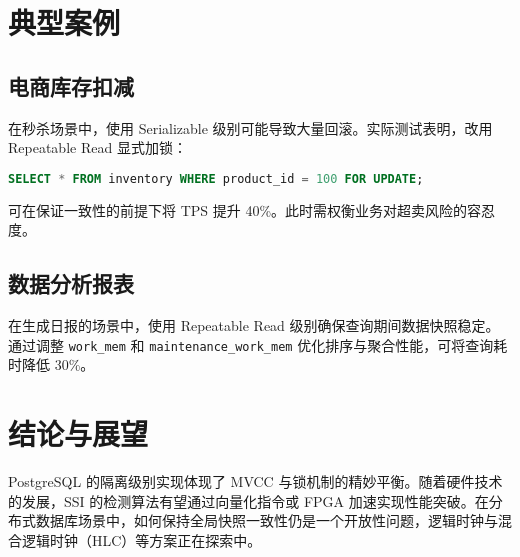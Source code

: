 \chapter{典型案例}
\section{电商库存扣减}
在秒杀场景中，使用 Serializable 级别可能导致大量回滚。实际测试表明，改用 Repeatable Read 显式加锁：\par
\begin{lstlisting}[language=sql]
SELECT * FROM inventory WHERE product_id = 100 FOR UPDATE;
\end{lstlisting}
可在保证一致性的前提下将 TPS 提升 40\%{}。此时需权衡业务对超卖风险的容忍度。\par
\section{数据分析报表}
在生成日报的场景中，使用 Repeatable Read 级别确保查询期间数据快照稳定。通过调整 \texttt{work\_{}mem} 和 \texttt{maintenance\_{}work\_{}mem} 优化排序与聚合性能，可将查询耗时降低 30\%{}。\par
\chapter{结论与展望}
PostgreSQL 的隔离级别实现体现了 MVCC 与锁机制的精妙平衡。随着硬件技术的发展，SSI 的检测算法有望通过向量化指令或 FPGA 加速实现性能突破。在分布式数据库场景中，如何保持全局快照一致性仍是一个开放性问题，逻辑时钟与混合逻辑时钟（HLC）等方案正在探索中。\par

